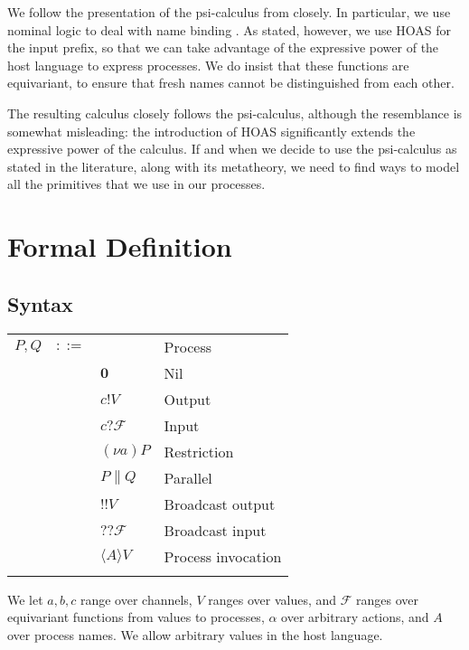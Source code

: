 \documentclass{article}
\newcommand{\pOut}{{!}}
\newcommand{\bOut}{{!\!!}}
\newcommand{\pIn}{{?}}
\newcommand{\bIn}{{?\!?}}
\newcommand{\new}[2]{(\nu\!#1) #2}
\newcommand{\nil}{\mathbf{0}}
\newcommand{\invoke}[1]{\langle #1 \rangle}
\newcommand{\psicalculus}{psi-calculus\xspace}
\begin{document}
We follow the presentation of the psi-calculus from \cite{Borgström2015}
closely. In particular, we use nominal logic to deal with name binding
\cite{Pitts2001,DBLP:journals/corr/abs-0809-3960}. As stated, however, we use
HOAS for the input prefix, so that we can take advantage of the expressive power
of the host language to express processes. We do insist that these functions are
equivariant, to ensure that fresh names cannot be distinguished from each other.

The resulting calculus closely follows the \psicalculus, although the
resemblance is somewhat misleading: the introduction of HOAS significantly
extends the expressive power of the calculus. If and when we decide to use the
\psicalculus as stated in the literature, along with its metatheory, we need to
find ways to model all the primitives that we use in our processes.

\section{Formal Definition}

\subsection{Syntax}

\begin{tabular}{llll}
$P, Q$ & $::=$ && Process \\
  && $\nil$               & Nil                \\
  && $c \pOut V$          & Output             \\
  && $c \pIn \mathcal{F}$ & Input              \\
  && $\new{a}{P}$         & Restriction        \\
  && $P \parallel Q$      & Parallel           \\
  && $\bOut V$            & Broadcast output   \\
  && $\bIn \mathcal{F}$   & Broadcast input    \\
  && $\invoke{A} V$       & Process invocation \\
\\
\end{tabular}

We let $a, b, c$ range over channels, $V$ ranges over values, and $\mathcal{F}$
ranges over equivariant functions from values to processes, $\alpha$ over
arbitrary actions, and $A$ over process names. We allow arbitrary values in the
host language.
\end{document}
